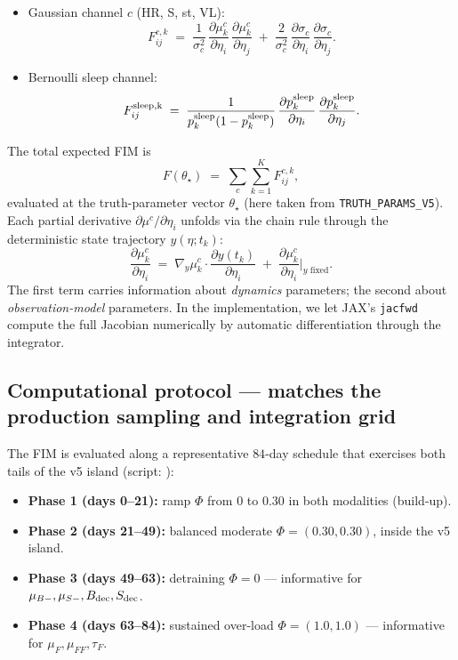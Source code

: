 \begin{itemize}
  \item Gaussian channel $c$ (HR, S, st, VL):
\begin{equation}
F^{c,k}_{ij} \;=\; \frac{1}{\sigma_c^2}\,\frac{\partial \mu^c_k}{\partial \eta_i}\,\frac{\partial \mu^c_k}{\partial \eta_j} \;+\; \frac{2}{\sigma_c^2}\,\frac{\partial \sigma_c}{\partial \eta_i}\,\frac{\partial \sigma_c}{\partial \eta_j}.
\label{eq:fim-gauss}
\end{equation}
  \item Bernoulli sleep channel:
\begin{equation}
F^{\rm sleep,k}_{ij} \;=\; \frac{1}{p^{\rm sleep}_k(1 - p^{\rm sleep}_k)}\,\frac{\partial p^{\rm sleep}_k}{\partial \eta_i}\,\frac{\partial p^{\rm sleep}_k}{\partial \eta_j}.
\label{eq:fim-bern}
\end{equation}
\end{itemize}
The total expected FIM is
\begin{equation}
F(\theta_\star) \;=\; \sum_{c} \sum_{k=1}^K F^{c,k}_{ij},
\label{eq:fim-total}
\end{equation}
evaluated at the truth-parameter vector $\theta_\star$ (here taken from \texttt{TRUTH\_PARAMS\_V5}). Each partial derivative $\partial \mu^c / \partial \eta_i$ unfolds via the chain rule through the deterministic state trajectory $y(\eta; t_k)$:
\begin{equation}
\frac{\partial \mu^c_k}{\partial \eta_i} \;=\; \nabla_y \mu^c_k \cdot \frac{\partial y(t_k)}{\partial \eta_i} \;+\; \frac{\partial \mu^c_k}{\partial \eta_i}\bigg|_{y \text{ fixed}}.
\end{equation}
The first term carries information about \emph{dynamics} parameters; the second about \emph{observation-model} parameters. In the implementation, we let JAX's \texttt{jacfwd} compute the full Jacobian numerically by automatic differentiation through the integrator.

\subsection{Computational protocol --- matches the production sampling and integration grid}

The FIM is evaluated along a representative $84$-day schedule that exercises both tails of the v5 island (script: ):
\begin{itemize}
  \item \textbf{Phase 1 (days 0--21):} ramp $\Phi$ from $0$ to $0.30$ in both modalities (build-up).
  \item \textbf{Phase 2 (days 21--49):} balanced moderate $\Phi = (0.30, 0.30)$, inside the v5 island.
  \item \textbf{Phase 3 (days 49--63):} detraining $\Phi = 0$ — informative for $\mu_{B-}, \mu_{S-}, B_{\rm dec}, S_{\rm dec}$.
  \item \textbf{Phase 4 (days 63--84):} sustained over-load $\Phi = (1.0, 1.0)$ — informative for $\mu_F, \mu_{FF}, \tau_F$.
\end{itemize}

